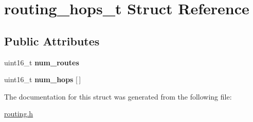 \hypertarget{structrouting__hops__t}{}\section{routing\+\_\+hops\+\_\+t Struct Reference}
\label{structrouting__hops__t}
\subsection*{Public Attributes}
\begin{DoxyCompactItemize}
\item 
\mbox{\label{structrouting__hops__t_ad16d5adc7ae446bd842048a66c810985}} 
uint16\+\_\+t {\bfseries num\+\_\+routes}
\item 
\mbox{\label{structrouting__hops__t_a3d5de8444c14a57fc6872cb27f20d7e9}} 
uint16\+\_\+t {\bfseries num\+\_\+hops} \mbox{[}$\,$\mbox{]}
\end{DoxyCompactItemize}


The documentation for this struct was generated from the following file\+:\begin{DoxyCompactItemize}
\item 
\hyperlink{routing_8h}{routing.\+h}\end{DoxyCompactItemize}
